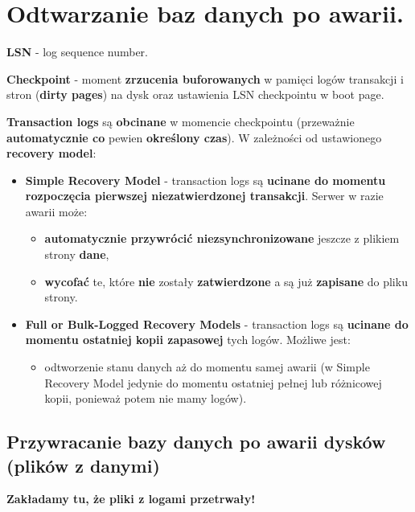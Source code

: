 \documentclass[a4paper]{article}
\begin{document}
    \section{Odtwarzanie baz danych po awarii.}
    \textbf{LSN} - log sequence number.

    \textbf{Checkpoint} - moment \textbf{zrzucenia buforowanych} w pamięci logów transakcji i stron (\textbf{dirty
    pages}) na dysk oraz ustawienia LSN checkpointu w boot page.

    \textbf{Transaction logs} są \textbf{obcinane} w momencie checkpointu (przeważnie \textbf{automatycznie co} pewien
    \textbf{określony czas}). W zależności od ustawionego \textbf{recovery model}:
    \begin{itemize}
        \item \textbf{Simple Recovery Model} - transaction logs są \textbf{ucinane do momentu rozpoczęcia pierwszej niezatwierdzonej transakcji}. Serwer w razie awarii może:
        \begin{itemize}
            \item \textbf{automatycznie przywrócić niezsynchronizowane} jeszcze z plikiem strony \textbf{dane},
            \item \textbf{wycofać} te, które \textbf{nie} zostały \textbf{zatwierdzone} a są już \textbf{zapisane} do pliku strony.
        \end{itemize}
        \item \textbf{Full or Bulk-Logged Recovery Models} - transaction logs są \textbf{ucinane do momentu ostatniej kopii zapasowej} tych logów. Możliwe jest:
        \begin{itemize}
            \item odtworzenie stanu danych aż do momentu samej awarii (w Simple Recovery Model jedynie do momentu ostatniej pełnej lub różnicowej kopii, ponieważ potem nie mamy logów).
        \end{itemize}
    \end{itemize}


    \subsection{Przywracanie bazy danych po awarii dysków (plików z danymi)}
    \textbf{Zakładamy tu, że pliki z logami przetrwały!}
\end{document}
